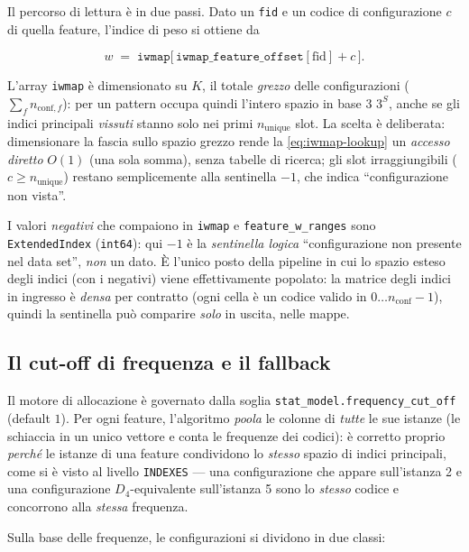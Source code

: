 Il percorso di lettura è in due passi. Dato un \texttt{fid} e un codice di
configurazione $c$ di quella feature, l'indice di peso si ottiene da

\begin{equation}
  w \;=\; \texttt{iwmap}\big[\, \texttt{iwmap\_feature\_offset}[\text{fid}] + c \,\big].
  \label{eq:iwmap-lookup}
\end{equation}

L'array \texttt{iwmap} è dimensionato su $K$, il totale \emph{grezzo} delle
configurazioni ($\sum_f n_{\text{conf},f}$): per un pattern occupa quindi
l'intero spazio in base 3 $3^{S}$, anche se gli indici principali
\emph{vissuti} stanno solo nei primi $n_{\text{unique}}$ slot. La scelta è
deliberata: dimensionare la fascia sullo spazio grezzo rende la
\eqref{eq:iwmap-lookup} un \emph{accesso diretto} $O(1)$ (una sola somma),
senza tabelle di ricerca; gli slot irraggiungibili
($c \ge n_{\text{unique}}$) restano semplicemente alla sentinella $-1$, che
indica ``configurazione non vista''.

I valori \emph{negativi} che compaiono in \texttt{iwmap} e
\texttt{feature\_w\_ranges} sono \texttt{ExtendedIndex} (\texttt{int64}): qui
$-1$ è la \emph{sentinella logica} ``configurazione non presente nel data
set'', \emph{non} un dato. È l'unico posto della pipeline in cui lo spazio
esteso degli indici (con i negativi) viene effettivamente popolato: la matrice
degli indici in ingresso è \emph{densa} per contratto (ogni cella è un codice
valido in $0 \ldots n_{\text{conf}}-1$), quindi la sentinella può comparire
\emph{solo} in uscita, nelle mappe.

\subsection{Il cut-off di frequenza e il fallback}

Il motore di allocazione è governato dalla soglia
\texttt{stat\_model.frequency\_cut\_off} (default $1$). Per ogni feature,
l'algoritmo \emph{poola} le colonne di \emph{tutte} le sue istanze (le
schiaccia in un unico vettore e conta le frequenze dei codici): è corretto
proprio \emph{perché} le istanze di una feature condividono lo \emph{stesso}
spazio di indici principali, come si è visto al livello
\texttt{INDEXES} — una configurazione che appare sull'istanza 2 e una
configurazione $D_4$-equivalente sull'istanza 5 sono lo \emph{stesso} codice e
concorrono alla \emph{stessa} frequenza.

Sulla base delle frequenze, le configurazioni si dividono in due classi:

